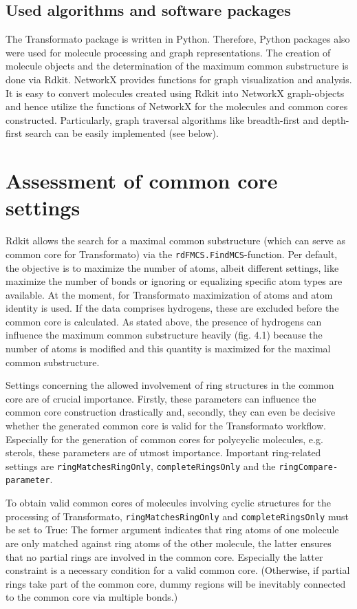 \subsection{Used algorithms and software packages}

The Transformato package is written in Python. Therefore, Python packages
also were used for molecule processing and graph representations.
The creation of molecule objects and the determination of the maximum
common substructure is done via Rdkit\cite{key-3}. NetworkX\cite{AricA.Hagberg.2008}
provides functions for graph visualization and analysis. It is easy to convert molecules created using Rdkit into NetworkX graph-objects
and hence utilize the functions of NetworkX for the molecules and
common cores constructed. Particularly, graph traversal algorithms
like breadth-first and depth-first search can be easily implemented
(see below).

\section{Assessment of common core settings}

Rdkit allows the search for a maximal common substructure (which can
serve as common core for Transformato) via the \texttt{rdFMCS.FindMCS}-function.
Per default, the objective is to maximize the number of atoms, albeit
different settings, like maximize the number of bonds or ignoring
or equalizing specific atom types are available. At the moment, for
Transformato maximization of atoms and atom identity is used. If the
data comprises hydrogens, these are excluded before the common core
is calculated. As stated above, the presence of hydrogens can influence
the maximum common substructure heavily (fig. 4.1) because the number of atoms is modified and this quantity is maximized for the maximal common substructure.


Settings concerning the allowed involvement of ring structures in
the common core are of crucial importance. Firstly, these parameters
can influence the common core construction drastically and, secondly, they
can even be decisive whether the generated common core is valid for the
Transformato workflow.
Especially for the generation of common cores for polycyclic molecules, e.g. sterols, these parameters are of utmost importance.  
Important ring-related settings are \texttt{ringMatchesRingOnly}, \texttt{completeRingsOnly}
and the \texttt{ringCompare-parameter}. 

To obtain valid common cores of molecules involving cyclic structures for the processing of Transformato, \texttt{ringMatchesRingOnly}
and \texttt{completeRingsOnly} must be set to True: The former argument indicates
that ring atoms of one molecule are only matched against ring atoms
of the other molecule, the latter ensures that no partial rings are
involved in the common core. Especially the latter constraint is a
necessary condition for a valid common core. (Otherwise, if partial
rings take part of the common core, dummy regions will be inevitably
connected to the common core via multiple bonds.)

